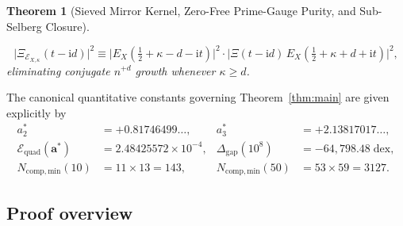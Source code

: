 \documentclass[11pt,reqno]{amsart}
\newtheorem{theorem}{Theorem}[section]
\theoremstyle{definition}
\theoremstyle{remark}
\numberwithin{equation}{section}
\newcommand{\ii}{\mathrm{i}}
\begin{document}
\begin{theorem}[Sieved Mirror Kernel, Zero-Free Prime-Gauge Purity, and Sub-Selberg Closure]
\begin{enumerate}[label=\textup{(\roman*)},leftmargin=2.2em]
\begin{equation}\label{eq:intro_outer_fact}
\bigl|\Xi_{\mathcal{E}_{X,\kappa}}(t - \ii d)\bigr|^2 \equiv \bigl|E_X(\tfrac{1}{2} + \kappa - d - \ii t)\bigr|^2 \cdot \bigl|\Xi(t - \ii d)\,E_X(\tfrac{1}{2} + \kappa + d + \ii t)\bigr|^2,
\end{equation}
eliminating conjugate $n^{+d}$ growth whenever $\kappa \ge d$.
\end{enumerate}
\end{theorem}

The canonical quantitative constants governing Theorem~\ref{thm:main} are given explicitly by
\begin{equation}\label{eq:canonical_constants}
\begin{aligned}
a_2^* &= +0.81746499\dots, & a_3^* &= +2.13817017\dots, \\
\mathcal{E}_{\mathrm{quad}}(\mathbf{a}^*) &= 2.48425572 \times 10^{-4}, & \Delta_{\mathrm{gap}}(10^8) &= -64{,}798.48\;\mathrm{dex}, \\
N_{\mathrm{comp,min}}(10) &= 11 \times 13 = 143, & N_{\mathrm{comp,min}}(50) &= 53 \times 59 = 3127.
\end{aligned}
\end{equation}

\subsection{Proof overview}\label{subsec:proof_overview}
\end{document}
